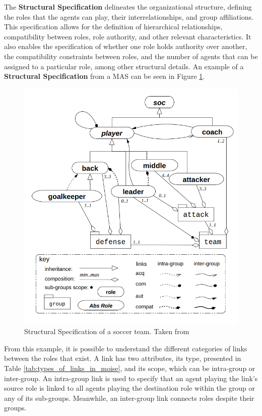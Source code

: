 The \textbf{Structural Specification} delineates the organizational structure, defining the roles that the agents can play, their interrelationships, and group affiliations. This specification allows for the definition of hierarchical relationships, compatibility between roles, role authority, and other relevant characteristics. It also enables the specification of whether one role holds authority over another, the compatibility constraints between roles, and the number of agents that can be assigned to a particular role, among other structural details. An example of a \textbf{Structural Specification} from a MAS can be seen in Figure \ref{fig:moise_ss}.

\begin{figure}
    \centering
    \includegraphics[width=0.75\linewidth]{chapters/background/images/MOISE - SS.png}
    \caption{Structural Specification of a soccer team. Taken from \cite{MOISEp}}
    \label{fig:moise_ss}
\end{figure}

From this example, it is possible to understand the different categories of links between the roles that exist. A link has two attributes, its type, presented in Table \ref{tab:types_of_links_in_moise}, and its scope, which can be intra-group or inter-group. An intra-group link is used to specify that an agent playing the link's source role is linked to all agents playing the destination role within the group or any of its sub-groups. Meanwhile, an inter-group link connects roles despite their groups.

